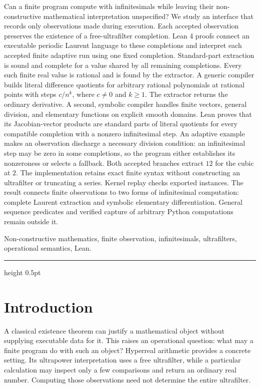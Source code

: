 \documentclass[11pt,a4paper]{article}
\theoremstyle{result}
\theoremstyle{definition}
\begin{document}
\begingroup
\small
\setlength{\parindent}{0pt}
\par\smallskip
Can a finite program compute with infinitesimals while leaving their non-constructive mathematical interpretation unspecified? We study an interface that records only observations made during execution. Each accepted observation preserves the existence of a free-ultrafilter completion. Lean 4 proofs connect an executable periodic Laurent language to these completions and interpret each accepted finite adaptive run using one fixed completion. Standard-part extraction is sound and complete for a value shared by all remaining completions. Every such finite real value is rational and is found by the extractor. A generic compiler builds literal difference quotients for arbitrary rational polynomials at rational points with steps $c/n^k$, where $c\ne0$ and $k\ge1$. The extractor returns the ordinary derivative. A second, symbolic compiler handles finite vectors, general division, and elementary functions on explicit smooth domains. Lean proves that its Jacobian-vector products are standard parts of literal quotients for every compatible completion with a nonzero infinitesimal step. An adaptive example makes an observation discharge a necessary division condition: an infinitesimal step may be zero in some completions, so the program either establishes its nonzeroness or selects a fallback. Both accepted branches extract $12$ for the cubic at $2$. The implementation retains exact finite syntax without constructing an ultrafilter or truncating a series. Kernel replay checks exported instances. The result connects finite observations to two forms of infinitesimal computation: complete Laurent extraction and symbolic elementary differentiation. General sequence predicates and verified capture of arbitrary Python computations remain outside it.
\par
\medskip
{}\enspace
Non-constructive mathematics, finite observation, infinitesimals, ultrafilters, operational semantics, Lean.
\par\endgroup
\vspace{10pt}
{\color{rulegray}\hrule height 0.5pt}
\vspace{5pt}

\section{Introduction}

A classical existence theorem can justify a mathematical object without supplying executable data for it. This raises an operational question: what may a finite program do with such an object? Hyperreal arithmetic provides a concrete setting. Its ultrapower interpretation uses a free ultrafilter, while a particular calculation may inspect only a few comparisons and return an ordinary real number. Computing those observations need not determine the entire ultrafilter.
\end{document}
